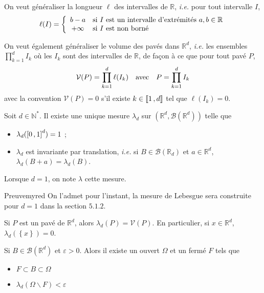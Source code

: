    On veut généraliser la longueur $\ell$ des intervalles de $\mathbb{R}$, \textit{i.e.} pour tout intervalle $I$, 
    \[ \ell(I) = \sisi{b - a}{I \text{ est un intervalle d’extrémités } a,b \in \mathbb{R}}{+\infty}{I \text{ est non borné}} \]

    On veut également généraliser le volume des pavés dans $\mathbb{R}^d$, \textit{i.e.} les ensembles $\prod_{k=1}^{d} I_k$ où les $I_k$ sont des intervalles de $\mathbb{R}$, de façon à ce que pour tout pavé $P$, 
    \[ \mathcal{V}(P) = \prod_{k=1}^{d} \ell(I_k) \quad \text{avec} \quad P = \prod_{k=1}^{d} I_k \]
    avec la convention $\mathcal{V}(P) = 0$ s’il existe $k \in \left\llbracket 1 \, , d \right\rrbracket$ tel que $\ell(I_k) = 0$.

    \begin{theo}{}{}
        Soit $d \in \mathbb{N}^*$. Il existe une unique mesure $\lambda_d$ sur $(\mathbb{R}^d, \mathcal{B}(\mathbb{R}^d))$ telle que 
        \begin{itemize}
            \item $\lambda_d(\left[ 0 \, , 1 \right]^d) = 1$ ;
            \item $\lambda_d$ est invariante par translation, \textit{i.e.} si $B \in \mathcal{B}(\mathbb{R}_d)$ et $a \in \mathbb{R}^d$, $\lambda_d(B + a) = \lambda_d(B)$.
        \end{itemize}
        Lorsque $d = 1$, on note $\lambda$ cette mesure.
    \end{theo}

    \begin{demo}{Preuve}{myred}
        On l’admet pour l’instant, la mesure de Lebesgue sera construite pour $d = 1$ dans la section $5.1.2$.
    \end{demo}

    \begin{prop}{}{}
        Si $P$ est un pavé de $\mathbb{R}^d$, alors $\lambda_d(P) = \mathcal{V}(P)$. En particulier, si $x \in \mathbb{R}^d$, $\lambda_d(\left\{x\right\}) = 0$.
    \end{prop}

    \begin{lem}{}{}
        Si $B \in \mathcal{B}(\mathbb{R}^d)$ et $\varepsilon > 0$. Alors il existe un ouvert $\Omega$ et un fermé $F$ tels que 
        \begin{itemize}
            \item $F \subset B \subset \Omega$
            \item $\lambda_d(\Omega \backslash F) < \varepsilon$
        \end{itemize}
    \end{lem}

